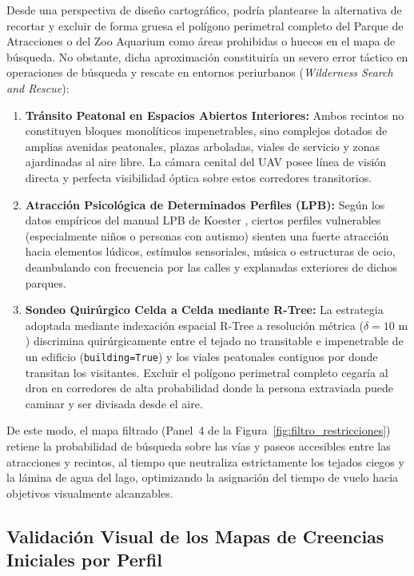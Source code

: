 Desde una perspectiva de diseño cartográfico, podría plantearse la alternativa de recortar y excluir de forma gruesa el polígono perimetral completo del Parque de Atracciones o del Zoo Aquarium como áreas prohibidas o huecos en el mapa de búsqueda. No obstante, dicha aproximación constituiría un severo error táctico en operaciones de búsqueda y rescate en entornos periurbanos (\textit{Wilderness Search and Rescue}):
\begin{enumerate}
    \item \textbf{Tránsito Peatonal en Espacios Abiertos Interiores:} Ambos recintos no constituyen bloques monolíticos impenetrables, sino complejos dotados de amplias avenidas peatonales, plazas arboladas, viales de servicio y zonas ajardinadas al aire libre. La cámara cenital del UAV posee línea de visión directa y perfecta visibilidad óptica sobre estos corredores transitorios.
    \item \textbf{Atracción Psicológica de Determinados Perfiles (LPB):} Según los datos empíricos del manual LPB de Koester \cite{koester2008lost}, ciertos perfiles vulnerables (especialmente niños o personas con autismo) sienten una fuerte atracción hacia elementos lúdicos, estímulos sensoriales, música o estructuras de ocio, deambulando con frecuencia por las calles y explanadas exteriores de dichos parques.
    \item \textbf{Sondeo Quirúrgico Celda a Celda mediante R-Tree:} La estrategia adoptada mediante indexación espacial R-Tree a resolución métrica ($\delta = 10\text{ m}$) discrimina quirúrgicamente entre el tejado no transitable e impenetrable de un edificio (\texttt{building=True}) y los viales peatonales contiguos por donde transitan los visitantes. Excluir el polígono perimetral completo cegaría al dron en corredores de alta probabilidad donde la persona extraviada puede caminar y ser divisada desde el aire.
\end{enumerate}

De este modo, el mapa filtrado (Panel~4 de la Figura~\ref{fig:filtro_restricciones}) retiene la probabilidad de búsqueda sobre las vías y paseos accesibles entre las atracciones y recintos, al tiempo que neutraliza estrictamente los tejados ciegos y la lámina de agua del lago, optimizando la asignación del tiempo de vuelo hacia objetivos visualmente alcanzables.

\subsection{Validación Visual de los Mapas de Creencias Iniciales por Perfil}
\label{sec:mapas_iniciales}

